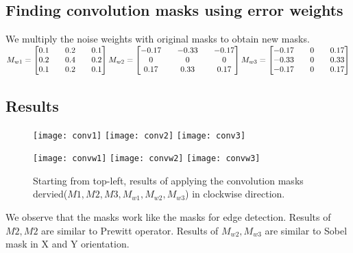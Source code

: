 \documentclass[paper=a4, fontsize=11pt]{scrartcl} %
\numberwithin{equation}{section} %
\numberwithin{figure}{section} %
\numberwithin{table}{section} %
\begin{document}
    \subsection{Finding convolution masks using error weights}
    We multiply the noise weights with original masks to obtain new masks.
    \\
    \(
      M_{w1} = \begin{bmatrix}
            0.1 && 0.2 && 0.1\\
            0.2 && 0.4 && 0.2\\
            0.1 && 0.2 && 0.1
          \end{bmatrix}
      \\
      M_{w2} = \begin{bmatrix}
            -0.17 && -0.33 && -0.17\\
              0 && 0 && 0  \\
             0.17 && 0.33 && 0.17
          \end{bmatrix}
      \\
      M_{w3} = \begin{bmatrix}
            -0.17 &&  0 && 0.17 \\ 
            -0.33 && 0 &&  0.33 \\ 
            -0.17 && 0 &&  0.17
          \end{bmatrix}
    \)
    \subsection{Results}

    \begin{figure}[h!]
        \centering
        \texttt{[image: conv1]}
        \texttt{[image: conv2]}
        \texttt{[image: conv3]}

        \texttt{[image: convw1]}
        \texttt{[image: convw2]}
        \texttt{[image: convw3]}

        \caption{Starting from top-left, results of applying the convolution masks dervied(\(M1,M2,M3,M_{w1}, M_{w2}, M_{w3}\)) in clockwise direction. }
    \end{figure}
        
    We observe that the masks work like the masks for edge detection. Results of \(M2, M2\) are similar to Prewitt operator. Results of \(M_{w2}, M_{w3}\) are similar to Sobel mask in X and Y orientation.
\end{document}
